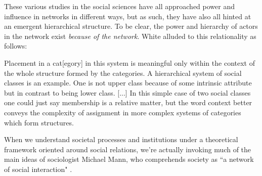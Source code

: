 \documentclass[3p,times]{elsarticle}
\begin{document}



These various studies in the social sciences have all approached power and influence in networks in different ways, but as such, they have also all hinted at an emergent hierarchical structure.
To be clear, the power and hierarchy of actors in the network exist \textit{because of the network}. White alluded to this relationality as follows:
\begin{displayquote}
Placement in a cat[egory] in this system is meaningful only within the context of the whole structure formed by the categories. A hierarchical system of social classes is an example. One is not upper class because of some intrinsic attribute but in contrast to being lower class. [...] In this simple case of two social classes one could just say membership is a relative matter, but the word context better conveys the complexity of assignment in more complex systems of categories which form structures. \cite[p. 177]{white2007catnets}
\end{displayquote}
When we understand societal processes and institutions under a theoretical framework oriented around social relations, we're actually invoking much of the main ideas of sociologist Michael Mann, who comprehends society as ``a network of social interaction" \cite{mann1986sources}. 
\end{document}
